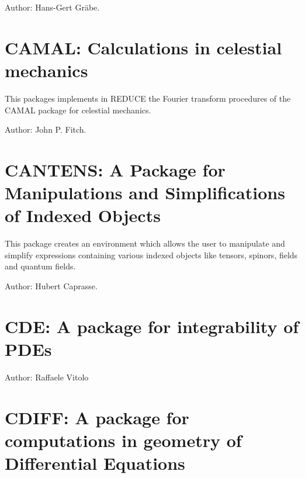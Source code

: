 \iffalse
This package contains algorithms for computations in commutative algebra
closely related to the Gr\"obner algorithm for ideals and modules.  Its
heart is a new implementation of the Gr\"obner algorithm that also allows
for the computation of syzygies.  This implementation is also applicable to
submodules of free modules with generators represented as rows of a matrix.
\fi
Author: Hans-Gert Gr\"abe.



\newpage

\section{CAMAL: Calculations in celestial mechanics}
\label{CAMAL}

This packages implements in REDUCE the Fourier transform procedures of the
CAMAL package for celestial mechanics.

Author: John P. Fitch.



\newpage

\section{CANTENS: A Package for Manipulations
and Simplifications of Indexed Objects}


This package creates an environment which allows the user to
manipulate and simplify expressions containing various indexed objects
like tensors, spinors, fields and quantum fields.

Author: Hubert Caprasse.



\newpage

\section{CDE: A package for integrability of PDEs}

Author: Raffaele Vitolo



\newpage

\section{CDIFF: A package for computations in geometry
  of Differential Equations}
\label{CDIFF}


